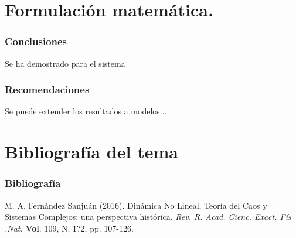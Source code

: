 \documentclass{beamer}
\begin{document}
\section{Formulaci\'on matem\'atica.}
\begin{frame}
	\frametitle{Conclusiones}
	\begin{minipage}{10cm}
	Se ha demostrado para el sistema 
	\end{minipage}
\end{frame}

\begin{frame}
	\frametitle{Recomendaciones}
	\begin{minipage}{10cm}
		Se puede extender los resultados a modelos... 
	\end{minipage}
\end{frame}
\section{Bibliograf\'ia del tema}
\begin{frame}
\frametitle{Bibliograf\'ia}
\begin{thebibliography}{99}

 M. A. Fern\'andez Sanju\'an (2016). Din\'amica No Lineal, Teor\'ia del Caos y Sistemas Complejos: una perspectiva hist\'orica. {\em Rev. R. Acad. Cienc. Exact. F\'is .Nat.} \textbf{Vol}. 109, N. 1?2, pp. 107-126.
\end{thebibliography}	
\end{frame}
\end{document}
